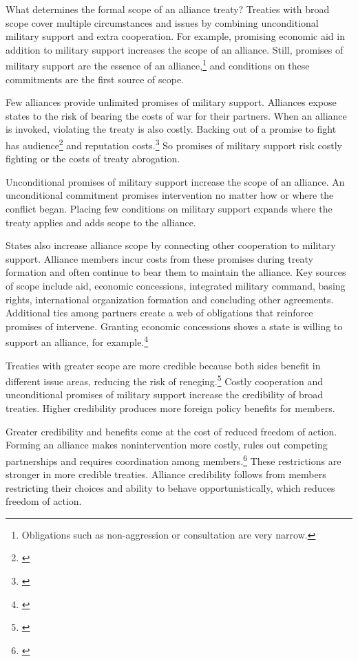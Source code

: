 \documentclass[12pt]{article}
\begin{document}
What determines the formal scope of an alliance treaty? 
Treaties with broad scope cover multiple circumstances and issues by combining unconditional military support and extra cooperation.
For example, promising economic aid in addition to military support increases the scope of an alliance.
Still, promises of military support are the essence of an alliance,\footnote{Obligations such as non-aggression or consultation are very narrow.} and conditions on these commitments are the first source of scope. 


Few alliances provide unlimited promises of military support. 
Alliances expose states to the risk of bearing the costs of war for their partners. 
When an alliance is invoked, violating the treaty is also costly. 
Backing out of a promise to fight has audience\footnote{\citep{Levyetal2015}} and reputation costs.\footnote{\citep{Gibler2008, Crescenzietal2012, Mattes2012}} 
So promises of military support risk costly fighting or the costs of treaty abrogation. 


Unconditional promises of military support increase the scope of an alliance. 
An unconditional commitment promises intervention no matter how or where the conflict began. 
Placing few conditions on military support expands where the treaty applies and adds scope to the alliance. 


States also increase alliance scope by connecting other cooperation to military support. 
Alliance members incur costs from these promises during treaty formation and often continue to bear them to maintain the alliance.
Key sources of scope include aid, economic concessions, integrated military command, basing rights, international organization formation and concluding other agreements. 
Additional ties among partners create a web of obligations that reinforce promises of intervene.  
Granting economic concessions shows a state is willing to support an alliance, for example.\footnote{\citep{WolfordKim2017}} 


Treaties with greater scope are more credible because both sides benefit in different issue areas, reducing the risk of reneging.\footnote{\citep{Poast2013}}
Costly cooperation and unconditional promises of military support increase the credibility of broad treaties.
Higher credibility produces more foreign policy benefits for members.


Greater credibility and benefits come at the cost of reduced freedom of action.
Forming an alliance makes nonintervention more costly, rules out competing partnerships and requires coordination among members.\footnote{\citep{Snyder1997}}
These restrictions are stronger in more credible treaties.
Alliance credibility follows from members restricting their choices and ability to behave opportunistically, which reduces freedom of action. 
\end{document}
